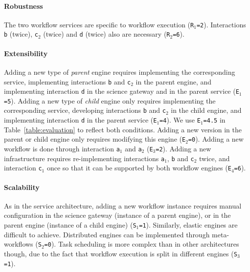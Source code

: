 \documentclass[preprint,3p,twocolumn]{elsarticle}
\newcommand{\note}[2]{\pdfmargincomment[color=yellow,author=#1,open=true]{#2}}
\newcommand{\closednote}[4]{} %
\begin{document}
\paragraph{Robustness} The two workflow services are specific to
workflow execution (\texttt{R$_1$=2}). Interactions \texttt{b}
(twice), \texttt{c$_2$} (twice) and \texttt{d} (twice) also
are necessary (\texttt{R$_2$=6}).
\closednote{Marc-e}{I understand both points. However, complexity is
  addressed in Robustness as well... I liked the idea of development effort. It's a tough call.}{Tristan}{Maybe 'integration challenge' is a good compromise.}

\paragraph{Extensibility} Adding a new type of \emph{parent} engine
requires implementing the corresponding service,  implementing
interactions \texttt{b} and \texttt{c$_2$} in the parent engine, and
implementing interaction \texttt{d} in the science gateway and in the
parent service (\texttt{E$_1$=5}). Adding a new type of \emph{child}
engine only requires implementing the corresponding service, 
developing interactions \texttt{b} and \texttt{c$_2$} in the child
engine, and implementing interaction \texttt{d} in the parent service
(\texttt{E$_1$=4}). We use \texttt{E$_1$=4.5} in
Table~\ref{table:evaluation} to reflect both conditions. Adding a new
version in the parent or child engine only requires modifying this
engine (\texttt{E$_2$=0}). Adding a new workflow is done through
interaction \texttt{a$_1$} and \texttt{a$_2$}
(\texttt{E$_3$=2}). Adding a new infrastructure requires 
re-implementing interactions \texttt{a$_1$}, \texttt{b} and
\texttt{c$_2$} twice, and interaction \texttt{c$_1$} once so that it
can be supported by both workflow engines (\texttt{E$_4$=6}).

\paragraph{Scalability} As in the service architecture, adding a new
workflow instance requires manual configuration in the science gateway
(instance of a parent engine), or in the parent engine (instance of a
child engine) (\texttt{S$_1$=1}). Similarly, elastic engines are
difficult to achieve. Distributed engines can be implemented through meta-workflows (\texttt{S$_2$=0}). Task scheduling
is more complex than in other architectures though, due to the fact
that workflow execution is split in different engines (\texttt{S$_3$=1}).
\end{document}
